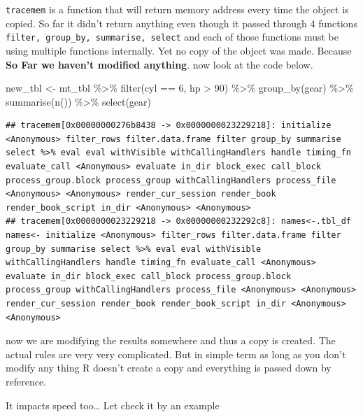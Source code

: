 \documentclass[
]{book}
\newenvironment{Shaded}{\begin{snugshade}}{\end{snugshade}}
\newcommand{\DecValTok}[1]{\textcolor[rgb]{0.00,0.00,0.81}{#1}}
\newcommand{\FunctionTok}[1]{\textcolor[rgb]{0.00,0.00,0.00}{#1}}
\newcommand{\NormalTok}[1]{#1}
\newcommand{\OtherTok}[1]{\textcolor[rgb]{0.56,0.35,0.01}{#1}}
\newcommand{\SpecialCharTok}[1]{\textcolor[rgb]{0.00,0.00,0.00}{#1}}
\begin{document}
\texttt{tracemem} is a function that will return memory address every time the object is copied. So far it didn't return anything even though it passed through 4 functions \texttt{filter,\ group\_by,\ summarise,\ select} and each of those functions must be using multiple functions internally. Yet no copy of the object was made. Because \textbf{So Far we haven't modified anything}. now look at the code below.

\begin{Shaded}
\begin{Highlighting}[]
\NormalTok{new\_tbl }\OtherTok{\textless{}{-}}\NormalTok{ mt\_tbl }\SpecialCharTok{\%\textgreater{}\%}
  \FunctionTok{filter}\NormalTok{(cyl }\SpecialCharTok{==} \DecValTok{6}\NormalTok{,}
\NormalTok{         hp }\SpecialCharTok{\textgreater{}} \DecValTok{90}\NormalTok{) }\SpecialCharTok{\%\textgreater{}\%}
  \FunctionTok{group\_by}\NormalTok{(gear) }\SpecialCharTok{\%\textgreater{}\%}
  \FunctionTok{summarise}\NormalTok{(}\FunctionTok{n}\NormalTok{()) }\SpecialCharTok{\%\textgreater{}\%}
  \FunctionTok{select}\NormalTok{(gear)}
\end{Highlighting}
\end{Shaded}

\begin{verbatim}
## tracemem[0x00000000276b8438 -> 0x0000000023229218]: initialize <Anonymous> filter_rows filter.data.frame filter group_by summarise select %>% eval eval withVisible withCallingHandlers handle timing_fn evaluate_call <Anonymous> evaluate in_dir block_exec call_block process_group.block process_group withCallingHandlers process_file <Anonymous> <Anonymous> render_cur_session render_book render_book_script in_dir <Anonymous> <Anonymous> 
## tracemem[0x0000000023229218 -> 0x00000000232292c8]: names<-.tbl_df names<- initialize <Anonymous> filter_rows filter.data.frame filter group_by summarise select %>% eval eval withVisible withCallingHandlers handle timing_fn evaluate_call <Anonymous> evaluate in_dir block_exec call_block process_group.block process_group withCallingHandlers process_file <Anonymous> <Anonymous> render_cur_session render_book render_book_script in_dir <Anonymous> <Anonymous>
\end{verbatim}

now we are modifying the results somewhere and thus a copy is created. The actual rules are very very complicated. But in simple term as long as you don't modify any thing R doesn't create a copy and everything is passed down by reference.

It impacts speed too\ldots{} Let check it by an example
\end{document}
